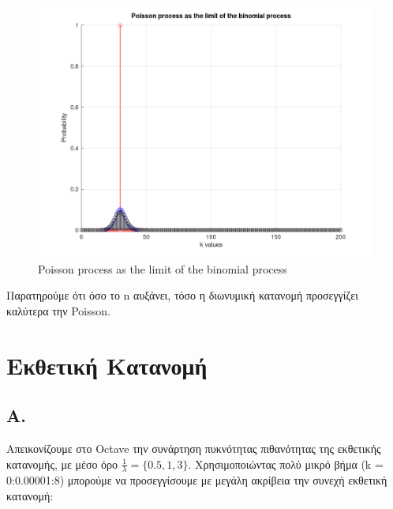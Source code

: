 \documentclass[a4paper]{article}
\begin{document}
\begin{figure}[H]
	\includegraphics[width=\textwidth]{../images/Poisson_Distribution_D.png}
	\caption{Poisson process as the limit of the binomial process}
	\label{fig:Poisson Distribution D}
\end{figure}

Παρατηρούμε ότι όσο το n αυξάνει, τόσο η διωνυμική κατανομή προσεγγίζει καλύτερα την Poisson.

\section*{Εκθετική Κατανομή}

\subsection*{Α.}

Απεικονίζουμε στο Octave την συνάρτηση πυκνότητας πιθανότητας της εκθετικής κατανομής, με μέσο όρο $\frac{1}{λ}=\{0.5,1,3\}$. Χρησιμοποιώντας πολύ μικρό βήμα (k = 0:0.00001:8) μπορούμε να προσεγγίσουμε με μεγάλη ακρίβεια την συνεχή εκθετική κατανομή:
\end{document}
